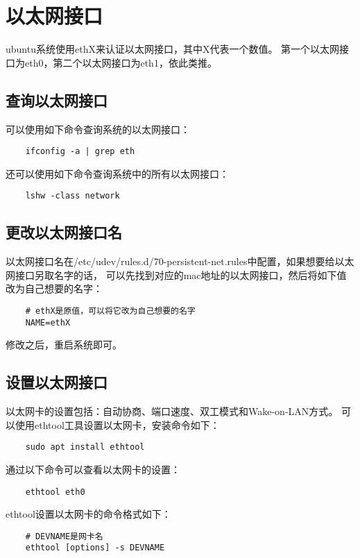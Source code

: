 \documentclass[a4paper,left=2.5cm,right=2.5cm,11pt]{article}
\begin{document}
\tableofcontents

\clearpage

\section{以太网接口}
	ubuntu系统使用ethX来认证以太网接口，其中X代表一个数值。
	第一个以太网接口为eth0，第二个以太网接口为eth1，依此类推。

\subsection{查询以太网接口}
	可以使用如下命令查询系统的以太网接口：
	\begin{lstlisting}
	ifconfig -a | grep eth
	\end{lstlisting}

	还可以使用如下命令查询系统中的所有以太网接口：
	\begin{lstlisting}
	lshw -class network
	\end{lstlisting}

\subsection{更改以太网接口名}
	以太网接口名在/etc/udev/rules.d/70-persistent-net.rules中配置，如果想要给以太网接口另取名字的话，
	可以先找到对应的mac地址的以太网接口，然后将如下值改为自己想要的名字：
	\begin{lstlisting}
	# ethX是原值，可以将它改为自己想要的名字
	NAME=ethX
	\end{lstlisting}

	修改之后，重启系统即可。

\subsection{设置以太网接口}
	以太网卡的设置包括：自动协商、端口速度、双工模式和Wake-on-LAN方式。
	可以使用ethtool工具设置以太网卡，安装命令如下：
	\begin{lstlisting}
	sudo apt install ethtool
	\end{lstlisting}

	通过以下命令可以查看以太网卡的设置：
	\begin{lstlisting}
	ethtool eth0
	\end{lstlisting}

	ethtool设置以太网卡的命令格式如下：
	\begin{lstlisting}
	# DEVNAME是网卡名
	ethtool [options] -s DEVNAME
	\end{lstlisting}
\end{document}
